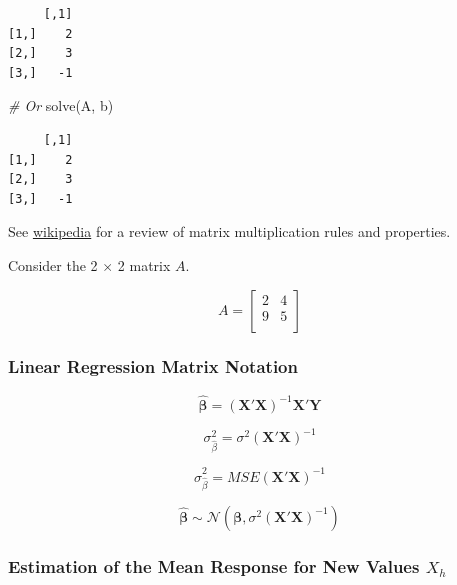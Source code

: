 \documentclass[
]{article}
\newenvironment{Shaded}{\begin{snugshade}}{\end{snugshade}}
\newcommand{\CommentTok}[1]{\textcolor[rgb]{0.56,0.35,0.01}{\textit{#1}}}
\newcommand{\FunctionTok}[1]{\textcolor[rgb]{0.00,0.00,0.00}{#1}}
\newcommand{\NormalTok}[1]{#1}
\begin{document}
\begin{verbatim}
     [,1]
[1,]    2
[2,]    3
[3,]   -1
\end{verbatim}

\begin{Shaded}
\begin{Highlighting}[]
\CommentTok{\# Or}
\FunctionTok{solve}\NormalTok{(A, b)}
\end{Highlighting}
\end{Shaded}

\begin{verbatim}
     [,1]
[1,]    2
[2,]    3
[3,]   -1
\end{verbatim}

See \href{https://en.wikipedia.org/wiki/Matrix_multiplication}{wikipedia} for a review of matrix multiplication rules and properties.

Consider the 2 \(\times\) 2 matrix \(A\).

\[A = \begin{bmatrix}
2 & 4 \\
9 & 5 \\
\end{bmatrix}
\]

\hypertarget{linear-regression-matrix-notation}{%
\subsubsection{Linear Regression Matrix Notation}\label{linear-regression-matrix-notation}}

\begin{equation}
\hat{\mathbf{\beta}} = (\mathbf{X'X})^{-1}\mathbf{X'Y}
\label{eq:betas}
\end{equation}

\begin{equation}
\sigma^2_{\hat{\beta}} = \sigma^2(\mathbf{X'X})^{-1}
\label{eq:varcov}
\end{equation}

\begin{equation}
\hat{\sigma}^2_{\hat{\beta}} = MSE(\mathbf{X'X})^{-1}
\label{eq:varcovest}
\end{equation}

\[\hat{\mathbf{\beta}} \sim\mathcal{N}(\mathbf{\beta}, \sigma^2(\mathbf{X'X})^{-1})\]

\hypertarget{estimation-of-the-mean-response-for-new-values-x_h}{%
\subsubsection{\texorpdfstring{Estimation of the Mean Response for New Values \(X_h\)}{Estimation of the Mean Response for New Values X\_h}}\label{estimation-of-the-mean-response-for-new-values-x_h}}
\end{document}
